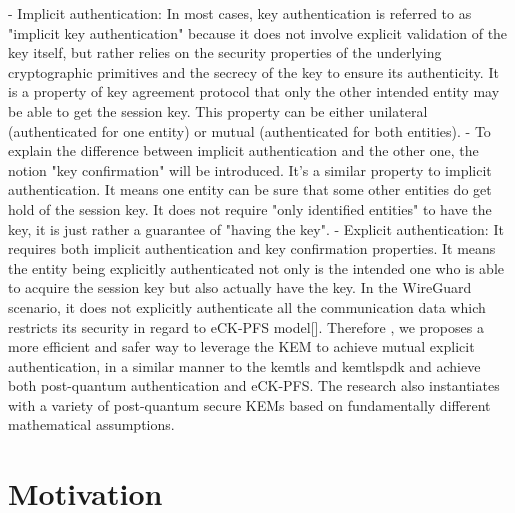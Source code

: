 - Implicit authentication: In most cases, key authentication is referred to as "implicit key authentication" because it does not involve explicit validation of the key itself, but rather relies on the security properties of the underlying cryptographic primitives and the secrecy of the key to ensure its authenticity. It is a property of key agreement protocol that only the other intended entity may be able to get the session key. This property can be either unilateral (authenticated for one entity) or mutual (authenticated for both entities).
- To explain the difference between implicit authentication and the other one, the notion "key confirmation" will be introduced. It's a similar property to implicit authentication. It means one entity can be sure that some other entities do get hold of the session key. It does not require "only identified entities" to have the key, it is just rather a guarantee of "having the key".
- Explicit authentication: It requires both implicit authentication and key confirmation properties. It means the entity being explicitly authenticated not only is the intended one who is able to acquire the session key but also actually have the key.
In the WireGuard scenario, it does not explicitly authenticate all the communication data which restricts its security in regard to eCK-PFS model[]. Therefore , we proposes a more efficient and safer way to leverage the KEM to achieve mutual explicit authentication, in a similar manner to the kemtls and kemtlspdk and achieve both post-quantum authentication and eCK-PFS. The research also instantiates with a variety of post-quantum secure KEMs based on fundamentally different mathematical assumptions. 

\section{Motivation}


